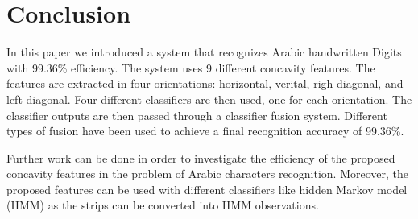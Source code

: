 \documentclass[conference]{IEEEtran}
\begin{document}
\section{Conclusion}
\label{sec:Conclusion}
  In this paper we introduced a system that recognizes Arabic handwritten Digits with 99.36\% efficiency. The system uses 9 different concavity features. The features are extracted in four orientations: horizontal, verital, righ diagonal, and left diagonal. Four different classifiers are then used, one for each orientation. The classifier outputs are then passed through a classifier fusion system. Different types of fusion have been used to achieve a final recognition accuracy of 99.36\%.


Further work can be done in order to investigate the efficiency of the proposed concavity features in the problem of Arabic characters recognition. Moreover, the proposed features can be used with different classifiers like hidden Markov model (HMM) as the strips can be converted into HMM observations.









%
\end{document}
